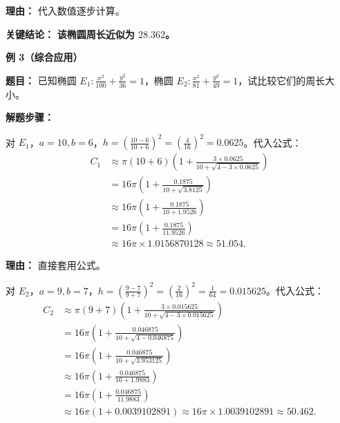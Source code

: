 \begin{examplebox}
\begin{description}[style=nextline, leftmargin=2.8em, labelsep=0.5em, itemsep=0.45em]
		      \par\textbf{理由：} 代入数值逐步计算。
	\end{description}

	\textbf{\textcolor{CExample}{关键结论：}} \textbf{该椭圆周长近似为 $28.362$。}

	\medskip

	\textbf{\textcolor{CExample}{例 3（综合应用）}}

	\textbf{\textcolor{CExample}{题目：}} 已知椭圆 $E_1:\frac{x^2}{100}+\frac{y^2}{36}=1$，椭圆 $E_2:\frac{x^2}{81}+\frac{y^2}{49}=1$，试比较它们的周长大小。

	\textbf{\textcolor{CExample}{解题步骤：}}

	\begin{description}[style=nextline, leftmargin=2.8em, labelsep=0.5em, itemsep=0.45em]
		\item[\textbf{第一步（计算E1周长）：}]
		      对 $E_1$，$a=10,b=6$，$h=\left(\frac{10-6}{10+6}\right)^2=\left(\frac{4}{16}\right)^2=0.0625$。代入公式：
		      \[
			      \begin{aligned}
				      C_1 & \approx \pi(10+6)\left(1+\frac{3\times0.0625}{10+\sqrt{4-3\times0.0625}}\right) \\
				          & = 16\pi\left(1+\frac{0.1875}{10+\sqrt{3.8125}}\right)                           \\
				          & \approx 16\pi\left(1+\frac{0.1875}{10+1.9526}\right)                            \\
				          & = 16\pi\left(1+\frac{0.1875}{11.9526}\right)                                    \\
				          & \approx 16\pi\times1.0156870128 \approx 51.054.
			      \end{aligned}
		      \]

		      \par\textbf{理由：} 直接套用公式。

		\item[\textbf{第二步（计算E2周长）：}]
		      对 $E_2$，$a=9,b=7$，$h=\left(\frac{9-7}{9+7}\right)^2=\left(\frac{2}{16}\right)^2=\frac{1}{64}=0.015625$。代入公式：
		      \[
			      \begin{aligned}
				      C_2 & \approx \pi(9+7)\left(1+\frac{3\times0.015625}{10+\sqrt{4-3\times0.015625}}\right) \\
				          & = 16\pi\left(1+\frac{0.046875}{10+\sqrt{4-0.046875}}\right)                        \\
				          & = 16\pi\left(1+\frac{0.046875}{10+\sqrt{3.953125}}\right)                          \\
				          & \approx 16\pi\left(1+\frac{0.046875}{10+1.9883}\right)                             \\
				          & = 16\pi\left(1+\frac{0.046875}{11.9883}\right)                                     \\
				          & \approx 16\pi(1+0.0039102891) \approx 16\pi\times1.0039102891 \approx 50.462.
			      \end{aligned}
		      \]


\end{description}
\end{examplebox}
